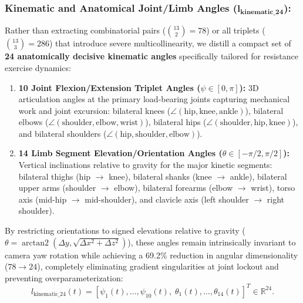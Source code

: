 \documentclass[runningheads]{llncs}
\begin{document}
\subsubsection{Kinematic and Anatomical Joint/Limb Angles ($\mathbf{l_{\text{kinematic\_24}}}$):}
Rather than extracting combinatorial pairs ($\binom{13}{2} = 78$) or all triplets ($\binom{13}{3} = 286$) that introduce severe multicollinearity, we distill a compact set of \textbf{24 anatomically decisive kinematic angles} specifically tailored for resistance exercise dynamics:
\begin{enumerate}
    \item \textbf{10 Joint Flexion/Extension Triplet Angles ($\psi \in [0, \pi]$):} 3D articulation angles at the primary load-bearing joints capturing mechanical work and joint excursion: bilateral knees ($\angle(\text{hip}, \text{knee}, \text{ankle})$), bilateral elbows ($\angle(\text{shoulder}, \text{elbow}, \text{wrist})$), bilateral hips ($\angle(\text{shoulder}, \text{hip}, \text{knee})$), and bilateral shoulders ($\angle(\text{hip}, \text{shoulder}, \text{elbow})$).
    \item \textbf{14 Limb Segment Elevation/Orientation Angles ($\theta \in [-\pi/2, \pi/2]$):} Vertical inclinations relative to gravity for the major kinetic segments: bilateral thighs (hip $\to$ knee), bilateral shanks (knee $\to$ ankle), bilateral upper arms (shoulder $\to$ elbow), bilateral forearms (elbow $\to$ wrist), torso axis (mid-hip $\to$ mid-shoulder), and clavicle axis (left shoulder $\to$ right shoulder).
\end{enumerate}
By restricting orientations to signed elevations relative to gravity ($\theta = \operatorname{arctan2}(\Delta y, \sqrt{\Delta x^2 + \Delta z^2})$), these angles remain intrinsically invariant to camera yaw rotation while achieving a 69.2\% reduction in angular dimensionality ($78 \to 24$), completely eliminating gradient singularities at joint lockout and preventing overparameterization:
\begin{equation}
    l_{\text{kinematic\_24}}(t) = \left[ \psi_1(t), \dots, \psi_{10}(t), \; \theta_1(t), \dots, \theta_{14}(t) \right]^T \in \mathbb{R}^{24}.
\end{equation}
\end{document}
